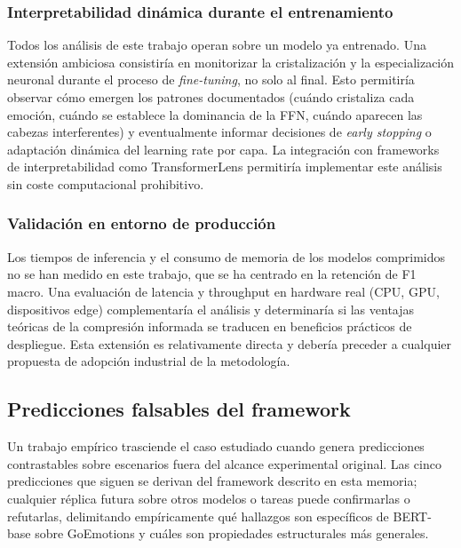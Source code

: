 \subsubsection{Interpretabilidad dinámica durante el entrenamiento}

Todos los análisis de este trabajo operan sobre un modelo ya entrenado. Una
extensión ambiciosa consistiría en monitorizar la cristalización y la
especialización neuronal durante el proceso de \emph{fine-tuning}, no solo al
final. Esto permitiría observar cómo emergen los patrones documentados
(cuándo cristaliza cada emoción, cuándo se establece la dominancia de la
FFN, cuándo aparecen las cabezas interferentes) y eventualmente informar
decisiones de \textit{early stopping} o adaptación dinámica del learning
rate por capa. La integración con frameworks de interpretabilidad como
TransformerLens permitiría implementar este análisis sin coste computacional
prohibitivo.

\subsubsection{Validación en entorno de producción}

Los tiempos de inferencia y el consumo de memoria de los modelos
comprimidos no se han medido en este trabajo, que se ha centrado en la
retención de F1 macro. Una evaluación de latencia y throughput en hardware
real (CPU, GPU, dispositivos edge) complementaría el análisis y determinaría
si las ventajas teóricas de la compresión informada se traducen en
beneficios prácticos de despliegue. Esta extensión es relativamente directa y
debería preceder a cualquier propuesta de adopción industrial de la
metodología.


\subsection{Predicciones falsables del framework}
\label{sec:predicciones-falsables}

Un trabajo empírico trasciende el caso estudiado cuando genera
predicciones contrastables sobre escenarios fuera del alcance
experimental original. Las cinco predicciones que siguen se derivan
del framework descrito en esta memoria; cualquier réplica futura sobre
otros modelos o tareas puede confirmarlas o refutarlas, delimitando
empíricamente qué hallazgos son específicos de BERT-base sobre
GoEmotions y cuáles son propiedades estructurales más generales.

